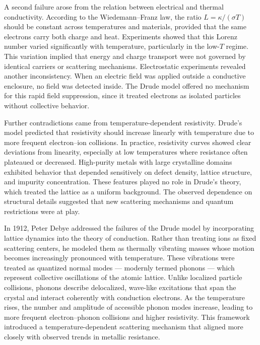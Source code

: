 A second failure arose from the relation between electrical and thermal conductivity. According to the Wiedemann–Franz law, the ratio $L = \kappa / (\sigma T)$ should be constant across temperatures and materials, provided that the same electrons carry both charge and heat. Experiments showed that this Lorenz number varied significantly with temperature, particularly in the low-$T$ regime. This variation implied that energy and charge transport were not governed by identical carriers or scattering mechanisms. Electrostatic experiments revealed another inconsistency. When an electric field was applied outside a conductive enclosure, no field was detected inside. The Drude model offered no mechanism for this rapid field suppression, since it treated electrons as isolated particles without collective behavior.

Further contradictions came from temperature-dependent resistivity. Drude’s model predicted that resistivity should increase linearly with temperature due to more frequent electron–ion collisions. In practice, resistivity curves showed clear deviations from linearity, especially at low temperatures where resistance often plateaued or decreased. High-purity metals with large crystalline domains exhibited behavior that depended sensitively on defect density, lattice structure, and impurity concentration. These features played no role in Drude’s theory, which treated the lattice as a uniform background. The observed dependence on structural details suggested that new scattering mechanisms and quantum restrictions were at play.

In 1912, Peter Debye addressed the failures of the Drude model by incorporating lattice dynamics into the theory of conduction. Rather than treating ions as fixed scattering centers, he modeled them as thermally vibrating masses whose motion becomes increasingly pronounced with temperature. These vibrations were treated as quantized normal modes — modernly termed phonons — which represent collective oscillations of the atomic lattice. Unlike localized particle collisions, phonons describe delocalized, wave-like excitations that span the crystal and interact coherently with conduction electrons. As the temperature rises, the number and amplitude of accessible phonon modes increase, leading to more frequent electron–phonon collisions and higher resistivity. This framework introduced a temperature-dependent scattering mechanism that aligned more closely with observed trends in metallic resistance.

